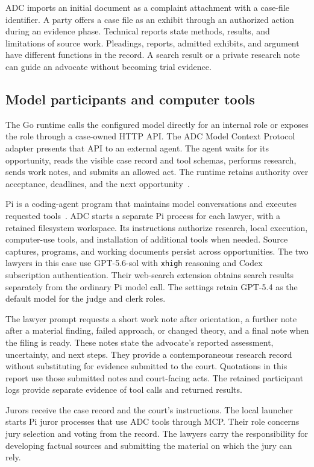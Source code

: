 \documentclass[11pt]{article}
\newcommand{\code}[1]{\texttt{#1}}
\begin{document}
ADC imports an initial document as a complaint attachment with a case-file identifier.  A party offers a case file as an exhibit through an authorized action during an evidence phase.  Technical reports state methods, results, and limitations of source work.  Pleadings, reports, admitted exhibits, and argument have different functions in the record.  A search result or a private research note can guide an advocate without becoming trial evidence.

\subsection{Model participants and computer tools}

The Go runtime calls the configured model directly for an internal role or exposes the role through a case-owned HTTP API.  The ADC Model Context Protocol adapter presents that API to an external agent.  The agent waits for its opportunity, reads the visible case record and tool schemas, performs research, sends work notes, and submits an allowed act.  The runtime retains authority over acceptance, deadlines, and the next opportunity~\cite{adcmanual,logic}.

Pi is a coding-agent program that maintains model conversations and executes requested tools~\cite{pi}.  ADC starts a separate Pi process for each lawyer, with a retained filesystem workspace.  Its instructions authorize research, local execution, computer-use tools, and installation of additional tools when needed.  Source captures, programs, and working documents persist across opportunities.  The two lawyers in this case use GPT-5.6-sol with \code{xhigh} reasoning and Codex subscription authentication.  Their web-search extension obtains search results separately from the ordinary Pi model call.  The settings retain GPT-5.4 as the default model for the judge and clerk roles.

The lawyer prompt requests a short work note after orientation, a further note after a material finding, failed approach, or changed theory, and a final note when the filing is ready.  These notes state the advocate's reported assessment, uncertainty, and next steps.  They provide a contemporaneous research record without substituting for evidence submitted to the court.  Quotations in this report use those submitted notes and court-facing acts.  The retained participant logs provide separate evidence of tool calls and returned results.

Jurors receive the case record and the court's instructions.  The local launcher starts Pi juror processes that use ADC tools through MCP.  Their role concerns jury selection and voting from the record.  The lawyers carry the responsibility for developing factual sources and submitting the material on which the jury can rely.
\end{document}
